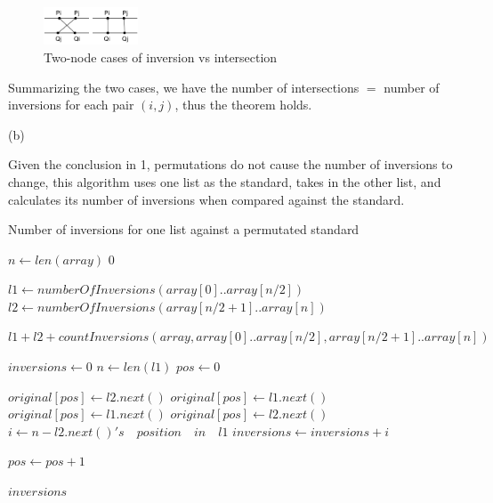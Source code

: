 \documentclass{article}
\begin{document}
\begin{description}
  \begin{figure}[h]
  \centering
  \includegraphics[width=0.25\textwidth]{pb2}
  \caption{Two-node cases of inversion vs intersection}
  \label{fig:pb2}
  \end{figure}

  Summarizing the two cases, we have the number of intersections $ = $ number of inversions for each pair $(i,j)$, thus the theorem holds. 

  (b)

  Given the conclusion in 1, permutations do not cause the number of inversions to change, this algorithm uses one list as the standard, takes in the other list, and calculates its number of inversions when compared against the standard.
  
  \begin{algorithm}[h]
  \caption{Number of inversions for one list against a permutated standard}
  \label{alg:number-of-inversions-mergesort}
    \begin{algorithmic}[1]
      \State $n \gets len(array)$
        \State \Return $0$
      \EndIf
      
      \State $l1 \gets numberOfInversions(array[0]..array[n/2])$
      \State $l2 \gets numberOfInversions(array[n/2+1]..array[n])$

      \State \Return $l1 + l2 + countInversions(array, array[0]..array[n/2], array[n/2+1]..array[n])$
    \EndFunction

      \State $inversions \gets 0$
      \State $n \gets len(l1)$
      \State $pos \gets 0$

          \State $original[pos] \gets l2.next()$
          \State $original[pos] \gets l1.next()$
          \State $original[pos] \gets l1.next()$
        \Else
          \State $original[pos] \gets l2.next()$
          \State $i \gets n - l2.next()'s \quad position \quad in \quad l1$
          \State $inversions \gets inversions + i$
        \EndIf
        
        \State $pos \gets pos + 1$
      \EndWhile

      \State \Return $inversions$
    \EndFunction


\end{algorithmic}
\end{algorithm}
\end{description}
\end{document}
